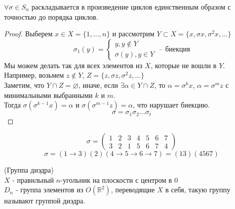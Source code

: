 \begin{stmt}
	$\forall \sigma \in S_n$ раскладывается в произведение циклов единственным образом с точностью до порядка циклов.
	\begin{proof}
		Выберем $x \in X = \{1, \dots, n\}$ и рассмотрим $Y \subset X = \{x, \sigma x, \sigma^2 x, \dots\}$
		\[
		\sigma_1(y) = 
		\begin{cases}
			y, y \notin Y \\
			\sigma(y), y \in Y
		\end{cases} \text{ -- биекция}
		\]
		Мы можем делать так для всех элементов из $X$, которые не вошли в $Y$. \\ Например, возьмем $z \notin Y$, $Z = \{z, \sigma z, \sigma^2 z, \dots\}$ \\
		Заметим, что $Y \cap Z = \varnothing$, иначе, если $\exists \alpha \in Y \cap Z$, то $\alpha = \sigma^k x$, $\alpha = \sigma^m z$ с минимальными выбранными $k$ и $m$. \\
		Тогда $\sigma(\sigma^{k-1}x) = \alpha$ и $\sigma(\sigma^{m-1}z) = \alpha$, что нарушает биекцию. 
		\[
		\sigma = \sigma_1 \sigma_2 \dots \sigma_t
		\]
	\end{proof}
\end{stmt}

\begin{example}
	\[
	\sigma = \begin{pmatrix}
		1 & 2 & 3 & 4 & 5 & 6 & 7 \\
		3 & 2 & 1 & 5 & 6 & 7 & 4
	\end{pmatrix}
	\]
	$$\sigma = (1 \to 3) (2) (4 \to 5 \to 6 \to 7) = (13)(4567)$$
\end{example}

\begin{definition}(Группа диэдра) \\
	$X$ - правильный $n$-угольник на плоскости с центром в 0 \\
	$D_n$ - группа элементов из $O\left(\mathbb{R}^2\right)$, переводящие $X$ в себя, такую группу называют группой диэдра.
\end{definition}

